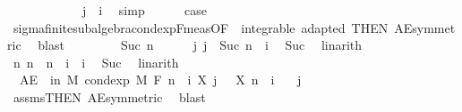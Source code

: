 \begin{isabellebody}
\ \ \ \ \isamarkupfalse%
\ {}\isanewline
\ \ \ \ \isamarkupfalse%
\ {\isachardoublequoteopen}j\ {\isacharequal}{\kern0pt}\ i{\isachardoublequoteclose}\ \isamarkupfalse%
\ simp\isanewline
\ \ \ \ \isamarkupfalse%
\ {\isacharquery}{\kern0pt}case\ \isamarkupfalse%
\ sigma{\isacharunderscore}{\kern0pt}finite{\isacharunderscore}{\kern0pt}subalgebra{\isachardot}{\kern0pt}cond{\isacharunderscore}{\kern0pt}exp{\isacharunderscore}{\kern0pt}F{\isacharunderscore}{\kern0pt}meas{\isacharbrackleft}{\kern0pt}OF\ {\isacharunderscore}{\kern0pt}\ integrable\ adapted{\isacharcomma}{\kern0pt}\ THEN\ AE{\isacharunderscore}{\kern0pt}symmetric{\isacharbrackright}{\kern0pt}\ \isamarkupfalse%
\ blast\isanewline
\ \ \isamarkupfalse%
\isanewline
\ \ \ \ \isamarkupfalse%
\ {\isacharparenleft}{\kern0pt}Suc\ n{\isacharparenright}{\kern0pt}\isanewline
\ \ \ \ \isamarkupfalse%
\ j{\isacharcolon}{\kern0pt}\ {\isachardoublequoteopen}j\ {\isacharequal}{\kern0pt}\ Suc\ {\isacharparenleft}{\kern0pt}n\ {\isacharplus}{\kern0pt}\ i{\isacharparenright}{\kern0pt}{\isachardoublequoteclose}\ \isamarkupfalse%
\ Suc\ \isamarkupfalse%
\ linarith\isanewline
\ \ \ \ \isamarkupfalse%
\ n{\isacharcolon}{\kern0pt}\ {\isachardoublequoteopen}n\ {\isacharequal}{\kern0pt}\ n\ {\isacharplus}{\kern0pt}\ i\ {\isacharminus}{\kern0pt}\ i{\isachardoublequoteclose}\ \isamarkupfalse%
\ Suc\ \isamarkupfalse%
\ linarith\isanewline
\ \ \ \ \isamarkupfalse%
\ {\isacharasterisk}{\kern0pt}{\isacharcolon}{\kern0pt}\ {\isachardoublequoteopen}AE\ {\isasymxi}\ in\ M{\isachardot}{\kern0pt}\ cond{\isacharunderscore}{\kern0pt}exp\ M\ {\isacharparenleft}{\kern0pt}F\ {\isacharparenleft}{\kern0pt}n\ {\isacharplus}{\kern0pt}\ i{\isacharparenright}{\kern0pt}{\isacharparenright}{\kern0pt}\ {\isacharparenleft}{\kern0pt}X\ j{\isacharparenright}{\kern0pt}\ {\isasymxi}\ {\isacharequal}{\kern0pt}\ X\ {\isacharparenleft}{\kern0pt}n\ {\isacharplus}{\kern0pt}\ i{\isacharparenright}{\kern0pt}\ {\isasymxi}{\isachardoublequoteclose}\ \isamarkupfalse%
\ j\ \isamarkupfalse%
\ assms{\isacharparenleft}{\kern0pt}{}{\isacharparenright}{\kern0pt}{\isacharbrackleft}{\kern0pt}THEN\ AE{\isacharunderscore}{\kern0pt}symmetric{\isacharbrackright}{\kern0pt}\ \isamarkupfalse%
\ blast\isanewline
\ \ \ \ \isamarkupfalse%

\end{isabellebody}
